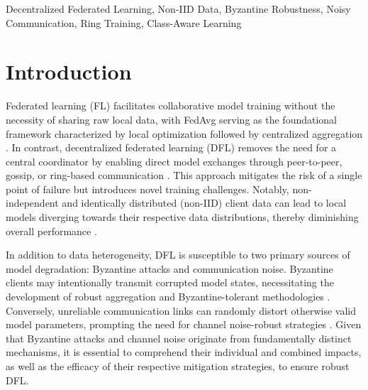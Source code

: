 \documentclass[conference]{IEEEtran}
\begin{document}
\begin{IEEEkeywords}
Decentralized Federated Learning, Non-IID Data, Byzantine Robustness, Noisy Communication, Ring Training, Class-Aware Learning
\end{IEEEkeywords}

\section{Introduction}
Federated learning (FL) facilitates collaborative model training without the necessity of sharing raw local data, with FedAvg serving as the foundational framework characterized by local optimization followed by centralized aggregation \cite{mcmahan_fedavg}. In contrast, decentralized federated learning (DFL) removes the need for a central coordinator by enabling direct model exchanges through peer-to-peer, gossip, or ring-based communication \cite{balancingcomm,fedisp,pfedgame}. This approach mitigates the risk of a single point of failure but introduces novel training challenges. Notably, non-independent and identically distributed (non-IID) client data can lead to local models diverging towards their respective data distributions, thereby diminishing overall performance \cite{zhao_non_iid,fedprox,scaffold}.

In addition to data heterogeneity, DFL is susceptible to two primary sources of model degradation: Byzantine attacks and communication noise. Byzantine clients may intentionally transmit corrupted model states, necessitating the development of robust aggregation and Byzantine-tolerant methodologies \cite{Byzantine_Tolerant_GD,geometric_median,fall_of_empires,analyzing_fl_adversarial,basil}. Conversely, unreliable communication links can randomly distort otherwise valid model parameters, prompting the need for channel noise-robust strategies \cite{unreliablecomm,wireless_edge_fl,robustwireless, NoiseComm}. Given that Byzantine attacks and channel noise originate from fundamentally distinct mechanisms, it is essential to comprehend their individual and combined impacts, as well as the efficacy of their respective mitigation strategies, to ensure robust DFL.
\end{document}
